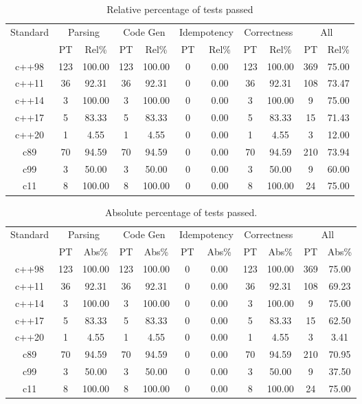 \documentclass{article}
\begin{document}
\begin{table}[h]
\begin{center}
\footnotesize
\begin{tabular}{ |c|c|c|c|c|c|c|c|c|c|c| }
\multicolumn{1}{|c|}{Standard} & \multicolumn{2}{c|}{Parsing} & \multicolumn{2}{c|}{Code Gen} & \multicolumn{2}{c|}{Idempotency} & \multicolumn{2}{c|}{Correctness} & \multicolumn{2}{c|}{All} \\
  & PT & Rel\% & PT & Rel\% & PT & Rel\% & PT & Rel\% & PT & Rel\% \\
\midrule
c++98 & 123 & 100.00 & 123 & 100.00 & 0 & 0.00 & 123 & 100.00 & 369 & 75.00 \\
c++11 & 36 & 92.31 & 36 & 92.31 & 0 & 0.00 & 36 & 92.31 & 108 & 73.47 \\
c++14 & 3 & 100.00 & 3 & 100.00 & 0 & 0.00 & 3 & 100.00 & 9 & 75.00 \\
c++17 & 5 & 83.33 & 5 & 83.33 & 0 & 0.00 & 5 & 83.33 & 15 & 71.43 \\
c++20 & 1 & 4.55 & 1 & 4.55 & 0 & 0.00 & 1 & 4.55 & 3 & 12.00 \\
c89 & 70 & 94.59 & 70 & 94.59 & 0 & 0.00 & 70 & 94.59 & 210 & 73.94 \\
c99 & 3 & 50.00 & 3 & 50.00 & 0 & 0.00 & 3 & 50.00 & 9 & 60.00 \\
c11 & 8 & 100.00 & 8 & 100.00 & 0 & 0.00 & 8 & 100.00 & 24 & 75.00 \\
\end{tabular}
\end{center}
\caption{Relative percentage of tests passed}
\end{table}\begin{table}[h]
\begin{center}
\footnotesize
\begin{tabular}{ |c|c|c|c|c|c|c|c|c|c|c| }
\multicolumn{1}{|c|}{Standard} & \multicolumn{2}{c|}{Parsing} & \multicolumn{2}{c|}{Code Gen} & \multicolumn{2}{c|}{Idempotency} & \multicolumn{2}{c|}{Correctness} & \multicolumn{2}{c|}{All} \\
  & PT & Abs\% & PT & Abs\% & PT & Abs\% & PT & Abs\% & PT & Abs\% \\
\midrule
c++98 & 123 & 100.00 & 123 & 100.00 & 0 & 0.00 & 123 & 100.00 & 369 & 75.00 \\
c++11 & 36 & 92.31 & 36 & 92.31 & 0 & 0.00 & 36 & 92.31 & 108 & 69.23 \\
c++14 & 3 & 100.00 & 3 & 100.00 & 0 & 0.00 & 3 & 100.00 & 9 & 75.00 \\
c++17 & 5 & 83.33 & 5 & 83.33 & 0 & 0.00 & 5 & 83.33 & 15 & 62.50 \\
c++20 & 1 & 4.55 & 1 & 4.55 & 0 & 0.00 & 1 & 4.55 & 3 & 3.41 \\
c89 & 70 & 94.59 & 70 & 94.59 & 0 & 0.00 & 70 & 94.59 & 210 & 70.95 \\
c99 & 3 & 50.00 & 3 & 50.00 & 0 & 0.00 & 3 & 50.00 & 9 & 37.50 \\
c11 & 8 & 100.00 & 8 & 100.00 & 0 & 0.00 & 8 & 100.00 & 24 & 75.00 \\
\end{tabular}
\end{center}
\caption{Absolute percentage of tests passed.}
\end{table}\newpage
\end{document}
